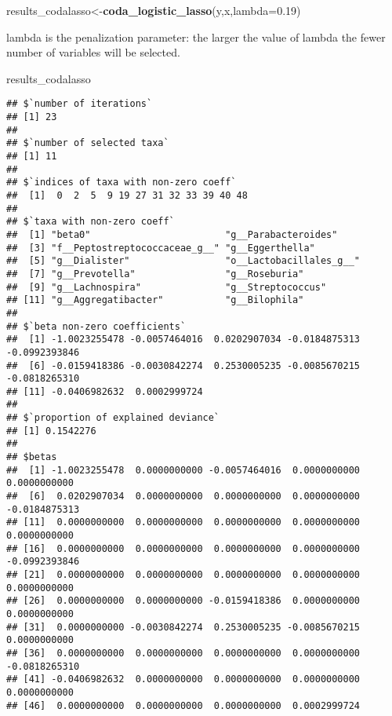 \documentclass[]{book}
\newenvironment{Shaded}{\begin{snugshade}}{\end{snugshade}}
\newcommand{\KeywordTok}[1]{\textcolor[rgb]{0.13,0.29,0.53}{\textbf{#1}}}
\newcommand{\DataTypeTok}[1]{\textcolor[rgb]{0.13,0.29,0.53}{#1}}
\newcommand{\FloatTok}[1]{\textcolor[rgb]{0.00,0.00,0.81}{#1}}
\newcommand{\NormalTok}[1]{#1}
\begin{document}
\begin{Shaded}
\begin{Highlighting}[]
\NormalTok{results_codalasso<-}\KeywordTok{coda_logistic_lasso}\NormalTok{(y,x,}\DataTypeTok{lambda=}\FloatTok{0.19}\NormalTok{)}
\end{Highlighting}
\end{Shaded}

lambda is the penalization parameter: the larger the value of lambda the
fewer number of variables will be selected.

\begin{Shaded}
\begin{Highlighting}[]
\NormalTok{results_codalasso}
\end{Highlighting}
\end{Shaded}

\begin{verbatim}
## $`number of iterations`
## [1] 23
## 
## $`number of selected taxa`
## [1] 11
## 
## $`indices of taxa with non-zero coeff`
##  [1]  0  2  5  9 19 27 31 32 33 39 40 48
## 
## $`taxa with non-zero coeff`
##  [1] "beta0"                        "g__Parabacteroides"          
##  [3] "f__Peptostreptococcaceae_g__" "g__Eggerthella"              
##  [5] "g__Dialister"                 "o__Lactobacillales_g__"      
##  [7] "g__Prevotella"                "g__Roseburia"                
##  [9] "g__Lachnospira"               "g__Streptococcus"            
## [11] "g__Aggregatibacter"           "g__Bilophila"                
## 
## $`beta non-zero coefficients`
##  [1] -1.0023255478 -0.0057464016  0.0202907034 -0.0184875313 -0.0992393846
##  [6] -0.0159418386 -0.0030842274  0.2530005235 -0.0085670215 -0.0818265310
## [11] -0.0406982632  0.0002999724
## 
## $`proportion of explained deviance`
## [1] 0.1542276
## 
## $betas
##  [1] -1.0023255478  0.0000000000 -0.0057464016  0.0000000000  0.0000000000
##  [6]  0.0202907034  0.0000000000  0.0000000000  0.0000000000 -0.0184875313
## [11]  0.0000000000  0.0000000000  0.0000000000  0.0000000000  0.0000000000
## [16]  0.0000000000  0.0000000000  0.0000000000  0.0000000000 -0.0992393846
## [21]  0.0000000000  0.0000000000  0.0000000000  0.0000000000  0.0000000000
## [26]  0.0000000000  0.0000000000 -0.0159418386  0.0000000000  0.0000000000
## [31]  0.0000000000 -0.0030842274  0.2530005235 -0.0085670215  0.0000000000
## [36]  0.0000000000  0.0000000000  0.0000000000  0.0000000000 -0.0818265310
## [41] -0.0406982632  0.0000000000  0.0000000000  0.0000000000  0.0000000000
## [46]  0.0000000000  0.0000000000  0.0000000000  0.0002999724
\end{verbatim}
\end{document}
